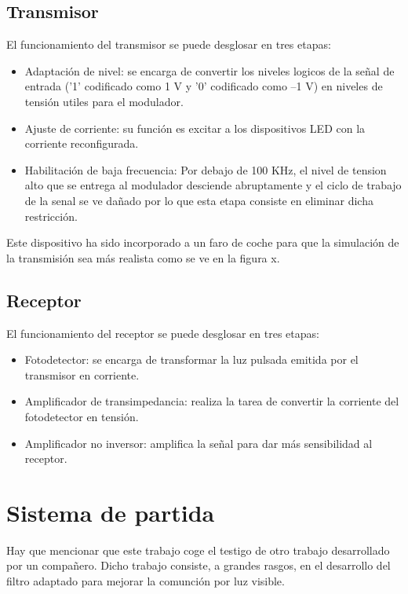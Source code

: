 \subsection{Transmisor}
El funcionamiento del transmisor se puede desglosar en tres etapas:
\begin{itemize}
    \item Adaptación de nivel: se encarga de convertir los niveles logicos de la señal 
    de entrada ('1' codificado como 1 V y '0' codificado como –1 V) en niveles de tensión 
    utiles para el modulador.
    \item Ajuste de corriente: su función es excitar a los dispositivos
    LED con la corriente reconfigurada.
    \item Habilitación de baja frecuencia: Por debajo de 100 KHz, el nivel de tension alto 
    que se entrega al modulador desciende abruptamente y el ciclo de trabajo de la senal se 
    ve dañado por lo que esta etapa consiste en eliminar dicha restricción.
\end{itemize}
Este dispositivo ha sido incorporado a un faro de coche para que la simulación de la 
transmisión sea más realista como se ve en la figura x.

\subsection{Receptor}
El funcionamiento del receptor se puede desglosar en tres etapas:
\begin{itemize}
    \item Fotodetector: se encarga de transformar la luz pulsada emitida por el transmisor
    en corriente.
    \item Amplificador de transimpedancia: realiza la tarea de convertir la corriente del 
    fotodetector en tensión.
    \item Amplificador no inversor: amplifica la señal para dar más sensibilidad al 
    receptor.
\end{itemize}

\section{Sistema de partida}
Hay que mencionar que este trabajo coge el testigo de otro trabajo desarrollado por un 
compañero. Dicho trabajo consiste, a grandes rasgos, en el desarrollo del filtro adaptado 
para mejorar la comunción por luz visible.  

